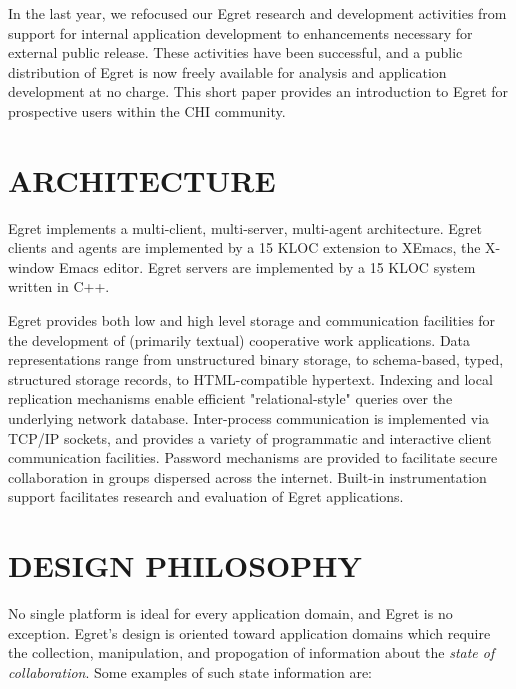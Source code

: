 In the last year, we refocused our Egret research and development
activities from support for internal application development to
enhancements necessary for external public release. These activities have
been successful, and a public distribution of Egret is now freely available
for analysis and application development at no charge.  This short paper
provides an introduction to Egret for prospective users within the CHI
community.


\section{ARCHITECTURE}

Egret implements a multi-client, multi-server, multi-agent architecture.
Egret clients and agents are implemented by a 15 KLOC extension to XEmacs,
the X-window Emacs editor. Egret servers are implemented by a 15 KLOC
system written in C++.   

Egret provides both low and high level storage and communication facilities
for the development of (primarily textual) cooperative work applications.
Data representations range from unstructured binary storage, to
schema-based, typed, structured storage records, to HTML-compatible
hypertext. Indexing and local replication mechanisms enable efficient
"relational-style" queries over the underlying network database.
Inter-process communication is implemented via TCP/IP sockets, and provides
a variety of programmatic and interactive client communication facilities.
Password mechanisms are provided to facilitate secure collaboration in
groups dispersed across the internet. Built-in instrumentation support
facilitates research and evaluation of Egret applications.


\section{DESIGN PHILOSOPHY}

No single platform is ideal for every application domain, and Egret is no
exception.  Egret's design is oriented toward application
domains which require the collection, manipulation, and propogation of 
information about the {\em state of collaboration}. Some examples of such 
state information are:

